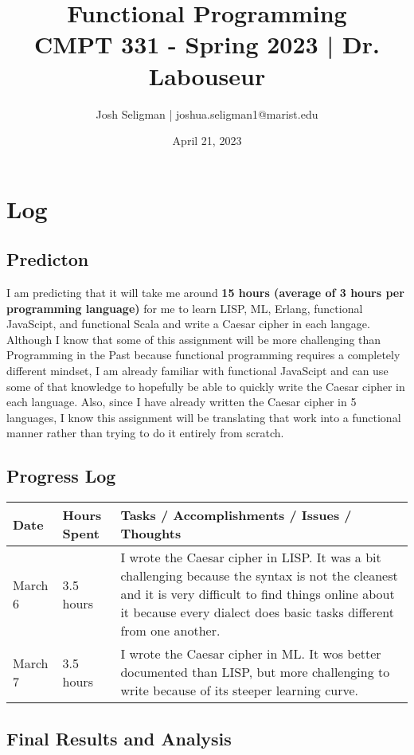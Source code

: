 \documentclass[letterpaper, 10pt, DIV=13]{scrartcl}
\title {
	\normalfont
	\huge{Functional Programming} \\
	\vspace{10pt}
	\large{CMPT 331 - Spring 2023 | Dr. Labouseur}
}
\author{\normalfont Josh Seligman | joshua.seligman1@marist.edu}
\date{\normalfont April 21, 2023}
\numberwithin{equation}{section}
\numberwithin{figure}{section}
\numberwithin{table}{section}
\begin{document}
\maketitle

\section{Log}
\subsection{Predicton}
I am predicting that it will take me around \textbf{15 hours (average of 3 hours per programming language)} for me to learn LISP, ML, Erlang, 
functional JavaScipt, and functional Scala and write a Caesar cipher in each langage. Although I know that some of this assignment will be more 
challenging than Programming in the Past because functional programming requires a completely different mindset, I am already familiar with 
functional JavaScipt and can use some of that knowledge to hopefully be able to quickly write the Caesar cipher in each language. Also, since I 
have already written the Caesar cipher in 5 languages, I know this assignment will be translating that work into a functional manner rather than 
trying to do it entirely from scratch. 

\subsection{Progress Log}
\begin{center}
	\begin{longtable}{|p{1in}|p{1in}|p{4in}|}
		\hline
		Date & Hours Spent & Tasks / Accomplishments / Issues / Thoughts
		\\
		\hline
        March 6 & 3.5 hours & I wrote the Caesar cipher in LISP. It was a bit challenging because the syntax is not the cleanest and it is very 
        difficult to find things online about it because every dialect does basic tasks different from one another.
        \\
		\hline
        March 7 & 3.5 hours & I wrote the Caesar cipher in ML. It wos better documented than LISP, but more challenging to write because of its 
        steeper learning curve.
        \\
        \hline
	\end{longtable}
\end{center}

\subsection{Final Results and Analysis}
\end{document}
